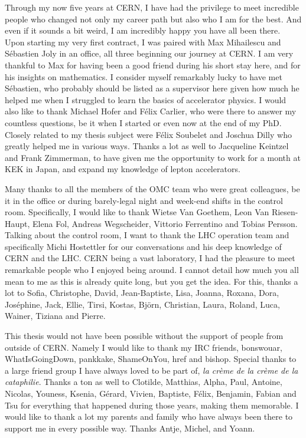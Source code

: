{Through my now five years at CERN, I have had the privilege to meet incredible people who changed
not only my career path but also who I am for the best. And even if it sounds a bit weird, I am
incredibly happy you have all been there.\\
\indent
Upon starting my very first contract, I was paired with Max Mihailescu and Sébastien Joly in an
office, all three beginning our journey at CERN. I am very thankful to Max for having been a good
friend during his short stay here, and for his insights on mathematics. I consider myself
remarkably lucky to have met Sébastien, who probably should be listed as a supervisor here given how 
much he helped me when I struggled to learn the basics of accelerator physics.
I would also like to thank Michael Hofer and Félix Carlier, who were there to answer my countless
questions, be it when I started or even now at the end of my PhD.
Closely related to my thesis subject were Félix Soubelet and Joschua Dilly who greatly helped me in
various ways.
Thanks a lot as well to Jacqueline Keintzel and Frank Zimmerman, to have given me the opportunity to
work for a month at KEK in Japan, and expand my knowledge of lepton accelerators. 

Many thanks to all the members of the OMC team who were great colleagues, be it in the office or
during barely-legal night and week-end shifts in the control room. Specifically, I would like to
thank Wietse Van Goethem, Leon Van Riesen-Haupt, Elena Fol, Andreas Wegscheider, Vittorio Ferrentino
and Tobias Persson. Talking about the control room, I want to thank the LHC operation team and
specifically Michi Hostettler for our conversations and his deep knowledge of CERN and the LHC.
\noindent
CERN being a vast laboratory, I had the pleasure to meet remarkable people who I enjoyed being
around. I cannot detail how much you all mean to me as this is already quite long, but you get the 
idea. For this, thanks a lot to Sofia, Christophe, David, Jean-Baptiste, Lisa, Joanna, Roxana, Dora,
Joséphine, Jack, Ellie, Tirsi, Kostas, Björn, Christian, Laura, Roland, Luca, Wainer, Tiziana and
Pierre.

This thesis would not have been possible without the support of people from outside of CERN. Namely
I would like to thank my IRC friends, bonswouar, WhatIsGoingDown, pankkake, ShameOnYou, href and
bishop. Special thanks to a large friend group I have always loved to be part of, \textit{la crème
de la crème de la cataphilie}.
Thanks a ton as well to Clotilde, Matthias, Alpha, Paul, Antoine, Nicolas, Youness, Ksenia, Gérard, Vivien,
Baptiste, Félix, Benjamin, Fabian and Tsu for everything that happened during those years,
making them memorable.
I would like to thank a lot my parents and family who have always been there to support me in every
possible way. Thanks Antje, Michel, and Yoann.

}